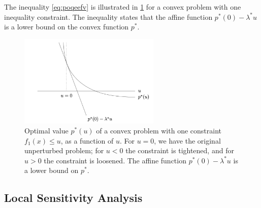 \documentclass{article}
\begin{document}
The inequality \cref{eq:poqeefv} is illustrated in \cref{fig:qfcvb} for a convex problem with one inequality constraint. The inequality states that the affine function $p^{* }(0)-\lambda^{* } u$ is a lower bound on the convex function $p^{* }$.
\begin{figure}
    \centering
    \includegraphics[width=0.6\textwidth]{Figs/13.png}
    \caption{Optimal value $p^{* }(u)$ of a convex problem with one constraint $f_{1}(x) \leq u$, as a function of $u$. For $u=0$, we have the original unperturbed problem; for $u<0$ the constraint is tightened, and for $u>0$ the constraint is loosened. The affine function $p^{* }(0)-\lambda^{* } u$ is a lower bound on $p^{* }$.}
    \label{fig:qfcvb}
\end{figure}
\subsection{Local Sensitivity Analysis}
\end{document}
